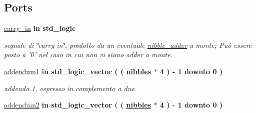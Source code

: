 \subsection*{Ports}
 \begin{DoxyCompactItemize}
\item 
\hyperlink{group___carry_loockahead_ga1c211cdf2d4cf97e869c442832c53439}{carry\+\_\+in}  {\bfseries {\bfseries \textcolor{vhdlchar}{in}\textcolor{vhdlchar}{ }}} {\bfseries \textcolor{vhdlchar}{std\+\_\+logic}\textcolor{vhdlchar}{ }} 
\begin{DoxyCompactList}\small\item\em segnale di \char`\"{}carry-\/in\char`\"{}, prodotto da un eventuale \hyperlink{classnibble__adder}{nibble\+\_\+adder} a monte; Può essere posto a '0' nel caso in cui non vi siano adder a monte. \end{DoxyCompactList}\item 
\hyperlink{group___carry_loockahead_gae4a2e124144a2f35270a55f0cf32a5ee}{addendum1}  {\bfseries {\bfseries \textcolor{vhdlchar}{in}\textcolor{vhdlchar}{ }}} {\bfseries \textcolor{vhdlchar}{std\+\_\+logic\+\_\+vector}\textcolor{vhdlchar}{ }\textcolor{vhdlchar}{(}\textcolor{vhdlchar}{ }\textcolor{vhdlchar}{(}\textcolor{vhdlchar}{ }\textcolor{vhdlchar}{ }\textcolor{vhdlchar}{ }\textcolor{vhdlchar}{ }{\bfseries \hyperlink{group___carry_loockahead_ga0b63b586531492d0fa882246cca071c1}{nibbles}} \textcolor{vhdlchar}{$\ast$}\textcolor{vhdlchar}{ } \textcolor{vhdldigit}{4} \textcolor{vhdlchar}{ }\textcolor{vhdlchar}{)}\textcolor{vhdlchar}{ }\textcolor{vhdlchar}{-\/}\textcolor{vhdlchar}{ } \textcolor{vhdldigit}{1} \textcolor{vhdlchar}{ }\textcolor{vhdlchar}{downto}\textcolor{vhdlchar}{ }\textcolor{vhdlchar}{ } \textcolor{vhdldigit}{0} \textcolor{vhdlchar}{ }\textcolor{vhdlchar}{)}\textcolor{vhdlchar}{ }} 
\begin{DoxyCompactList}\small\item\em addendo 1, espresso in complemento a due \end{DoxyCompactList}\item 
\hyperlink{group___carry_loockahead_ga2715463c615cf8418f85c6a1427ce62c}{addendum2}  {\bfseries {\bfseries \textcolor{vhdlchar}{in}\textcolor{vhdlchar}{ }}} {\bfseries \textcolor{vhdlchar}{std\+\_\+logic\+\_\+vector}\textcolor{vhdlchar}{ }\textcolor{vhdlchar}{(}\textcolor{vhdlchar}{ }\textcolor{vhdlchar}{(}\textcolor{vhdlchar}{ }\textcolor{vhdlchar}{ }\textcolor{vhdlchar}{ }\textcolor{vhdlchar}{ }{\bfseries \hyperlink{group___carry_loockahead_ga0b63b586531492d0fa882246cca071c1}{nibbles}} \textcolor{vhdlchar}{$\ast$}\textcolor{vhdlchar}{ } \textcolor{vhdldigit}{4} \textcolor{vhdlchar}{ }\textcolor{vhdlchar}{)}\textcolor{vhdlchar}{ }\textcolor{vhdlchar}{-\/}\textcolor{vhdlchar}{ } \textcolor{vhdldigit}{1} \textcolor{vhdlchar}{ }\textcolor{vhdlchar}{downto}\textcolor{vhdlchar}{ }\textcolor{vhdlchar}{ } \textcolor{vhdldigit}{0} \textcolor{vhdlchar}{ }\textcolor{vhdlchar}{)}\textcolor{vhdlchar}{ }} 

\end{DoxyCompactItemize}
